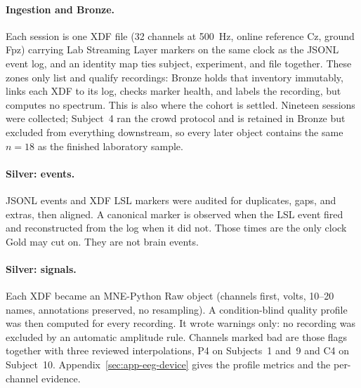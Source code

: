 \documentclass[english]{article}
\begin{document}
\paragraph{Ingestion and Bronze.}
Each session is one XDF file (32 channels at 500~Hz, online reference Cz, ground Fpz) carrying Lab Streaming Layer markers on the same clock as the JSONL event log, and an identity map ties subject, experiment, and file together. These zones only list and qualify recordings: Bronze holds that inventory immutably, links each XDF to its log, checks marker health, and labels the recording, but computes no spectrum. This is also where the cohort is settled. Nineteen sessions were collected; Subject~4 ran the crowd protocol and is retained in Bronze but excluded from everything downstream, so every later object contains the same \(n=18\) as the finished laboratory sample.

\paragraph{Silver: events.}
JSONL events and XDF LSL markers were audited for duplicates, gaps, and extras, then aligned. A canonical marker is observed when the LSL event fired and reconstructed from the log when it did not. Those times are the only clock Gold may cut on. They are not brain events.

\paragraph{Silver: signals.}
Each XDF became an MNE-Python Raw object (channels first, volts, 10--20 names, annotations preserved, no resampling). A condition-blind quality profile was then computed for every recording. It wrote warnings only: no recording was excluded by an automatic amplitude rule. Channels marked bad are those flags together with three reviewed interpolations, P4 on Subjects~1 and~9 and C4 on Subject~10. Appendix~\ref{sec:app-eeg-device} gives the profile metrics and the per-channel evidence.
\end{document}
